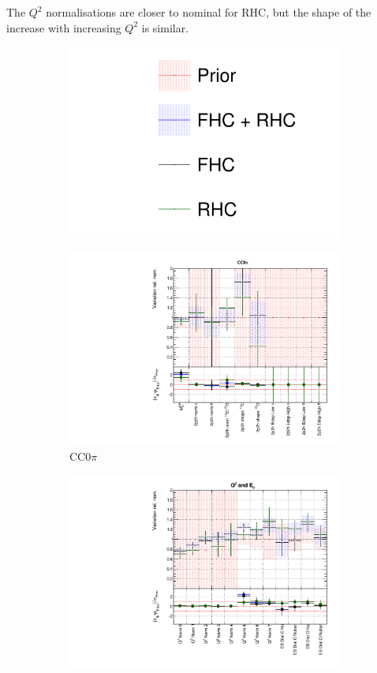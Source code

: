 The $Q^2$ normalisations are closer to nominal for RHC, but the shape of the increase with increasing $Q^2$ is similar. 

\begin{figure}
\centering
\begin{subfigure}{0.95\textwidth}
  \centering
  \includegraphics[width=0.25\linewidth]{figs/fhcrhcfits_leg}
\end{subfigure}
\begin{subfigure}{0.49\textwidth}
  \centering
  \includegraphics[width=0.9\linewidth]{figs/fhcrhcfitsxsec_1}
  \caption{CC0$\pi$}
\end{subfigure}
\begin{subfigure}{0.49\textwidth}
  \centering
  \includegraphics[width=0.9\linewidth]{figs/fhcrhcfitsxsec_2}

\end{subfigure}
\end{figure}
